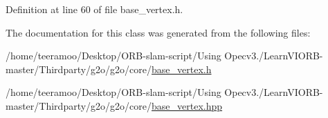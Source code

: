 Definition at line 60 of file base\+\_\+vertex.\+h.



The documentation for this class was generated from the following files\+:\begin{DoxyCompactItemize}
\item 
/home/teeramoo/\+Desktop/\+O\+R\+B-\/slam-\/script/\+Using Opecv3./\+Learn\+V\+I\+O\+R\+B-\/master/\+Thirdparty/g2o/g2o/core/\hyperlink{base__vertex_8h}{base\+\_\+vertex.\+h}\item 
/home/teeramoo/\+Desktop/\+O\+R\+B-\/slam-\/script/\+Using Opecv3./\+Learn\+V\+I\+O\+R\+B-\/master/\+Thirdparty/g2o/g2o/core/\hyperlink{base__vertex_8hpp}{base\+\_\+vertex.\+hpp}\end{DoxyCompactItemize}

